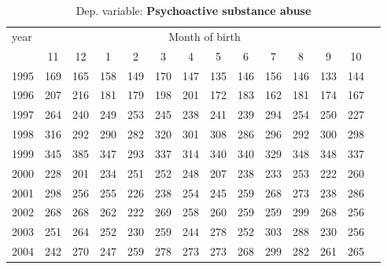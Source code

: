  \begin{table}[H] \begin{threeparttable} \centering \caption{Dep. variable: \textbf{Psychoactive substance abuse}} {\def\sym#1{\ifmmode^{#1}\else\(^{#1}\)\fi} \begin{tabular}{l*{13}{c}} \toprule year & \multicolumn{12}{c}{Month of birth} \\ \cmidrule(lr){2-13} 
            &          11&          12&           1&           2&           3&           4&           5&           6&           7&           8&           9&          10\\
1995        &         169&         165&         158&         149&         170&         147&         135&         146&         156&         146&         133&         144\\
1996        &         207&         216&         181&         179&         198&         201&         172&         183&         162&         181&         174&         167\\
1997        &         264&         240&         249&         253&         245&         238&         241&         239&         294&         254&         250&         227\\
1998        &         316&         292&         290&         282&         320&         301&         308&         286&         296&         292&         300&         298\\
1999        &         345&         385&         347&         293&         337&         314&         340&         340&         329&         348&         348&         337\\
2000        &         228&         201&         234&         251&         252&         248&         207&         238&         233&         253&         222&         260\\
2001        &         298&         256&         255&         226&         238&         254&         245&         259&         268&         273&         238&         286\\
2002        &         268&         268&         262&         222&         269&         258&         260&         259&         259&         299&         268&         256\\
2003        &         251&         264&         252&         230&         259&         244&         278&         252&         303&         288&         230&         256\\
2004        &         242&         270&         247&         259&         278&         273&         273&         268&         299&         282&         261&         265\\

\end{tabular}}
\end{threeparttable}
\end{table}
